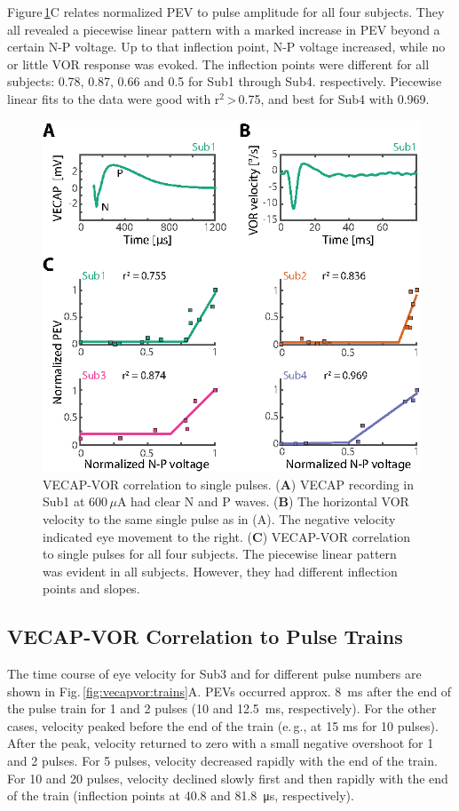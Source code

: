Figure\,\ref{fig:vecapvor:single}C relates normalized PEV to pulse amplitude for all four subjects. They all revealed a piecewise linear pattern with a marked increase in PEV beyond a certain N-P voltage. Up to that inflection point, N-P voltage increased, while no or little VOR response was evoked. The inflection points were different for all subjects: 0.78, 0.87, 0.66 and  0.5 for Sub1 through Sub4.  respectively. Piecewise linear fits to the data were good with r$^2$\,\textgreater\,0.75, and best for Sub4 with 0.969. 
\begin{figure}[btp]
\centering
\includegraphics{chapters/partI/vecapvor/figures/Fig_vecapvor_single.eps} 
\caption[VECAP-VOR correlation to single pulses]{VECAP-VOR correlation to single pulses. (\textbf{A}) VECAP recording in Sub1 at 600\,$\mu$A had clear N and P waves. (\textbf{B}) The horizontal VOR velocity to the same single pulse as in (A). The negative velocity indicated eye movement to the right. (\textbf{C}) VECAP-VOR correlation to single pulses for all four subjects. The piecewise linear pattern was evident in all subjects. However, they had different inflection points and  slopes.}
\label{fig:vecapvor:single}
\end{figure}

\subsection{VECAP-VOR Correlation to Pulse Trains}
The time course of eye velocity for Sub3 and for different pulse numbers are shown in Fig.\,\ref{fig:vecapvor:trains}A. PEVs occurred approx. \SI{8}{\milli\second} after the end of the pulse train for 1 and 2 pulses (10 and \SI{12.5}{ms}, respectively). For the other cases, velocity peaked before the end of the train (e.\,g., at 15 ms for 10 pulses). After the peak, velocity returned to zero with a small negative overshoot for 1 and 2 pulses. For 5 pulses, velocity decreased rapidly with the end of the train. For 10 and 20 pulses, velocity declined slowly first and then rapidly with the end of the train (inflection points at 40.8 and \SI{81.8}{\micro\second}, respectively).

